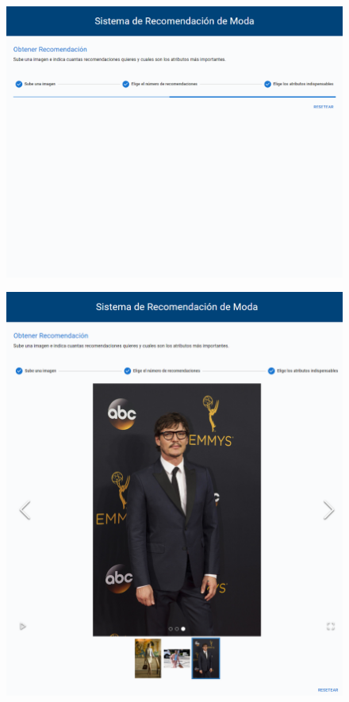 \documentclass[12pt]{report} %
\begin{document}
\begin{itemize}
		\begin{figure}[H]
			{\includegraphics[scale=0.3]{pantalla-carga.png}}
		\end{figure}
		\begin{figure}[H]
			{\includegraphics[scale=0.3]{output.png}}
		\end{figure}

	\end{itemize}
\end{document}
